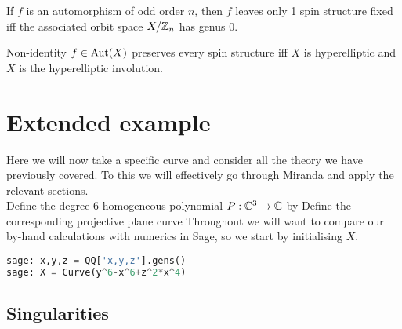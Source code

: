 \documentclass{article}
\begin{document}
\begin{prop}
	If $f$ is an automorphism of odd order $n$, then $f$ leaves only 1 spin structure fixed iff the associated orbit space $X/\mathbb{Z}_n$ has genus 0. 
\end{prop}

\begin{theorem}
	Non-identity $f \in \operatorname{Aut}(X)$ preserves every spin structure iff $X$ is hyperelliptic and $X$ is the hyperelliptic involution. 
\end{theorem}


\section{Extended example}
Here we will now take a specific curve and consider all the theory we have previously covered. To this we will effectively go through Miranda \cite{Miranda1995} and apply the relevant sections. \\
Define the degree-$6$ homogeneous polynomial $P:\mathbb{C}^3 \to \mathbb{C}$ by 
Define the corresponding projective plane curve 
Throughout we will want to compare our by-hand calculations with numerics in Sage, so we start by initialising $X$. 
\begin{lstlisting}[language=Python,frame=single]
sage: x,y,z = QQ['x,y,z'].gens()
sage: X = Curve(y^6-x^6+z^2*x^4)
\end{lstlisting}

\subsection{Singularities}
\end{document}
